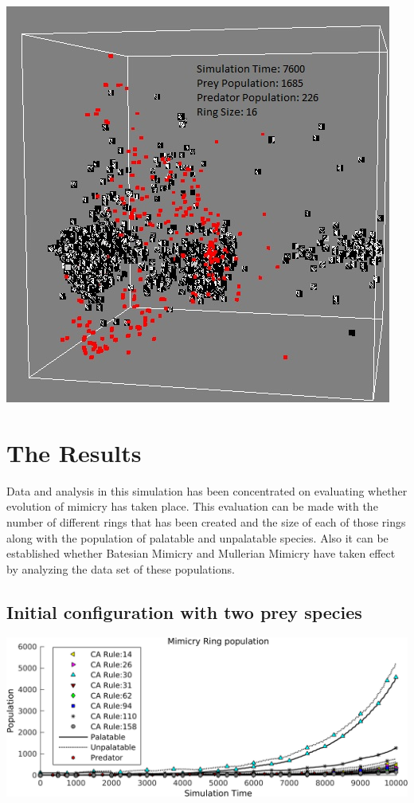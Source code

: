 \documentclass[a0,portrait]{a0poster}
\begin{document}
\begin{multicols}{2}
\begin{center}\vspace{1cm}
\includegraphics[width=0.5\linewidth]{simTime7600.jpg}
\end{center}\vspace{1cm}

\section*{The Results}

Data and analysis in this simulation has been concentrated on evaluating whether evolution of mimicry has taken place. This evaluation can be made with the number of different rings that has been created and the size of each of those rings along with the population of palatable and unpalatable species. Also it can be established whether Batesian Mimicry and Mullerian Mimicry have taken effect by analyzing the data set of these populations.

\subsection*{Initial configuration with two prey species}

\begin{center}\vspace{1cm}
\includegraphics[width=0.8\linewidth]{simTime10k-2Prey.png}
\end{center}\vspace{1cm}


\end{multicols}
\end{document}
